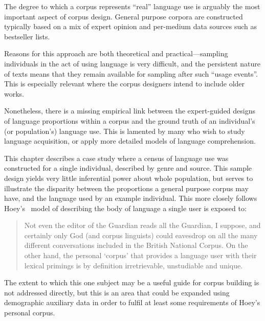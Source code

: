 The degree to which a corpus represents ``real'' language use is arguably the most important aspect of corpus design.  General purpose corpora are constructed typically based on a mix of expert opinion and per-medium data sources such as bestseller lists.


Reasons for this approach are both theoretical and practical---sampling individuals in the act of using language is very difficult, and the persistent nature of texts means that they remain available for sampling after such ``usage events''.  This is especially relevant where the corpus designers intend to include older works.

Nonetheless, there is a missing empirical link between the expert-guided designs of language proportions within a corpus and the ground truth of an individual's (or population's) language use.  This is lamented by many who wish to study language acquisition, or apply more detailed models of language comprehension.

This chapter describes a case study where a census of language use was constructed for a single individual, described by genre and source.  This sample design yields very little inferential power about whole population, but serves to illustrate the disparity between the proportions a general purpose corpus may have, and the language used by an example individual.  This more closely follows Hoey's~\cite[p.14]{hoey2005lexical} model of describing the body of language a single user is exposed to:

\begin{quote}
Not even the editor of the Guardian reads all the Guardian, I suppose, and certainly only God (and corpus linguists) could eavesdrop on all the many different conversations included in the British National Corpus.  On the other hand, the personal `corpus' that provides a language user with their lexical primings is by definition irretrievable, unstudiable and unique.
\end{quote}

The extent to which this one subject may be a useful guide for corpus building is not addressed directly, but this is an area that could be expanded using demographic auxiliary data in order to fulfil at least some requirements of Hoey's personal corpus.

